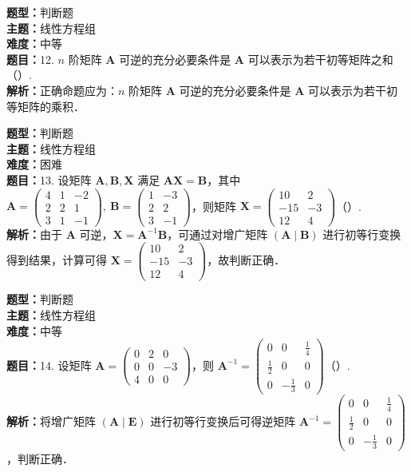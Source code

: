 \documentclass{ctexart}
\newenvironment{question}[5]{%
	\noindent\textbf{题型：}#1\\
	\textbf{主题：}#2\\
	\textbf{难度：}#3\\
	\textbf{题目：}#4\\
	\textbf{解析：}#5\\
	\vspace{1em}
}{}
\begin{document}
	\begin{question}
		{判断题}
		{线性方程组}
		{中等}
		{12. \(n\) 阶矩阵 \(\mathbf{A}\) 可逆的充分必要条件是 \(\mathbf{A}\) 可以表示为若干初等矩阵之和（）. }
		{正确命题应为：\(n\) 阶矩阵 \(\mathbf{A}\) 可逆的充分必要条件是 \(\mathbf{A}\) 可以表示为若干初等矩阵的乘积．}
	\end{question}
	
	\begin{question}
		{判断题}
		{线性方程组}
		{困难}
		{13. 设矩阵 \(\mathbf{A}, \mathbf{B}, \mathbf{X}\) 满足 \(\mathbf{A}\mathbf{X}=\mathbf{B}\)，其中 \(\mathbf{A}=\begin{pmatrix}4 & 1 & -2 \\ 2 & 2 & 1 \\ 3 & 1 & -1\end{pmatrix},\ \mathbf{B}=\begin{pmatrix}1 & -3 \\ 2 & 2 \\ 3 & -1\end{pmatrix}\)，则矩阵 \(\mathbf{X}=\begin{pmatrix}10 & 2 \\ -15 & -3 \\ 12 & 4\end{pmatrix}\)（）. }
		{由于 \(\mathbf{A}\) 可逆，\(\mathbf{X} = \mathbf{A}^{-1}\mathbf{B}\)，可通过对增广矩阵 \((\mathbf{A} \mid \mathbf{B})\) 进行初等行变换得到结果，计算可得 \(\mathbf{X} = \begin{pmatrix}10 & 2 \\ -15 & -3 \\ 12 & 4\end{pmatrix}\)，故判断正确．}
	\end{question}
	
	\begin{question}
		{判断题}
		{线性方程组}
		{中等}
		{14. 设矩阵 \(\mathbf{A}=\begin{pmatrix}0 & 2 & 0 \\ 0 & 0 & -3 \\ 4 & 0 & 0\end{pmatrix}\)，则 \(\mathbf{A}^{-1}=\begin{pmatrix}0 & 0 & \frac{1}{4} \\ \frac{1}{2} & 0 & 0 \\ 0 & -\frac{1}{3} & 0\end{pmatrix}\)（）. }
		{将增广矩阵 \((\mathbf{A} \mid \mathbf{E})\) 进行初等行变换后可得逆矩阵 \(\mathbf{A}^{-1}=\begin{pmatrix}0 & 0 & \frac{1}{4} \\ \frac{1}{2} & 0 & 0 \\ 0 & -\frac{1}{3} & 0\end{pmatrix}\)，判断正确．}
	\end{question}
	
\end{document}
